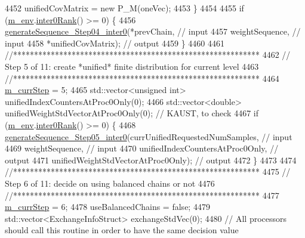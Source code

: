 \begin{DoxyCode}
{{4452       unifiedCovMatrix = \textcolor{keyword}{new} P\_M(oneVec);
4453     \}
4454 
4455     \textcolor{keywordflow}{if} (\hyperlink{class_q_u_e_s_o_1_1_m_l_sampling_a13f1ca4fe9f94822fe572a743eaced1d}{m\_env}.\hyperlink{class_q_u_e_s_o_1_1_base_environment_ae106b5bb8a80b655b88b3a26b1e7c185}{inter0Rank}() >= 0) \{
4456       \hyperlink{class_q_u_e_s_o_1_1_m_l_sampling_a955fb446652327edbc275e3d9145e2db}{generateSequence\_Step04\_inter0}(*prevChain,         \textcolor{comment}{// input}
4457                                      weightSequence,     \textcolor{comment}{// input}
4458                                      *unifiedCovMatrix); \textcolor{comment}{// output}
4459     \}
4460 
4461     \textcolor{comment}{//***********************************************************}
4462     \textcolor{comment}{// Step 5 of 11: create *unified* finite distribution for current level}
4463     \textcolor{comment}{//***********************************************************}
4464     \hyperlink{class_q_u_e_s_o_1_1_m_l_sampling_a1b1f8ccb4823bdfa26ec652f0807c63e}{m\_currStep} = 5;
4465     std::vector<unsigned int> unifiedIndexCountersAtProc0Only(0);
4466     std::vector<double>       unifiedWeightStdVectorAtProc0Only(0); \textcolor{comment}{// KAUST, to check}
4467     \textcolor{keywordflow}{if} (\hyperlink{class_q_u_e_s_o_1_1_m_l_sampling_a13f1ca4fe9f94822fe572a743eaced1d}{m\_env}.\hyperlink{class_q_u_e_s_o_1_1_base_environment_ae106b5bb8a80b655b88b3a26b1e7c185}{inter0Rank}() >= 0) \{
4468       \hyperlink{class_q_u_e_s_o_1_1_m_l_sampling_a3db529d364d5bb47916066d7cc21cb00}{generateSequence\_Step05\_inter0}(currUnifiedRequestedNumSamples,     \textcolor{comment}{//
       input}
4469                                      weightSequence,                     \textcolor{comment}{// input}
4470                                      unifiedIndexCountersAtProc0Only,    \textcolor{comment}{// output}
4471                                      unifiedWeightStdVectorAtProc0Only); \textcolor{comment}{// output}
4472     \}
4473 
4474     \textcolor{comment}{//***********************************************************}
4475     \textcolor{comment}{// Step 6 of 11: decide on using balanced chains or not}
4476     \textcolor{comment}{//***********************************************************}
4477     \hyperlink{class_q_u_e_s_o_1_1_m_l_sampling_a1b1f8ccb4823bdfa26ec652f0807c63e}{m\_currStep} = 6;
4478     useBalancedChains = \textcolor{keyword}{false};
4479     std::vector<ExchangeInfoStruct> exchangeStdVec(0);
4480     \textcolor{comment}{// All processors should call this routine in order to have the same decision value}
}}
\end{DoxyCode}
